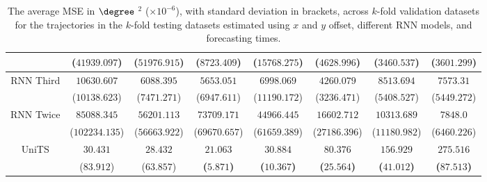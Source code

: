 \begin{table}[!ht]
{\begin{tabular}{|c|c|c|c|c|c|c|c|}
			 & ($41939.097$) & ($51976.915$) & ($8723.409$) & ($15768.275$) & ($4628.996$) & ($3460.537$) & ($3601.299$) \\ \hline
			\multirow{2}{*}{RNN Third} & $10630.607$ & $6088.395$ & $5653.051$ & $6998.069$ & $4260.079$ & $8513.694$ & $7573.31$ \\
			 & ($10138.623$) & ($7471.271$) & ($6947.611$) & ($11190.172$) & ($3236.471$) & ($5408.527$) & ($5449.272$) \\ \hline
			\multirow{2}{*}{RNN Twice} & $85088.345$ & $56201.113$ & $73709.171$ & $44966.445$ & $16602.712$ & $10313.689$ & $7848.0$ \\
			 & ($102234.135$) & ($56663.922$) & ($69670.657$) & ($61659.389$) & ($27186.396$) & ($11180.982$) & ($6460.226$) \\ \hline
			\multirow{2}{*}{UniTS} & $30.431$ & $28.432$ & $\mathbf{21.063}$ & $\mathbf{30.884}$ & $\mathbf{80.376}$ & $\mathbf{156.929}$ & $\mathbf{275.516}$ \\
			 & ($83.912$) & ($63.857$) & \textbf{(}$\mathbf{5.871}$\textbf{)} & \textbf{(}$\mathbf{10.367}$\textbf{)} & \textbf{(}$\mathbf{25.564}$\textbf{)} & \textbf{(}$\mathbf{41.012}$\textbf{)} & \textbf{(}$\mathbf{87.513}$\textbf{)} \\ \hline
		\end{tabular}
	}
	\caption{The average MSE in $\degree$ $^{2}$ ($\times 10^{-6}$), with standard deviation in brackets, across $k$-fold validation datasets for the trajectories in the $k$-fold testing datasets estimated using $x$ and $y$ offset, different RNN models, and forecasting times.}
	\label{tab:all_no_abs_MSE}
\end{table}